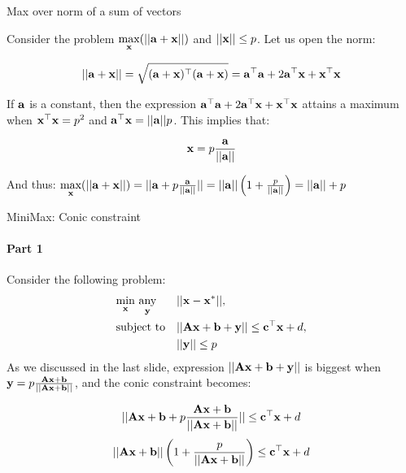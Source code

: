 \documentclass{beamer}
\begin{document}
\begin{frame}{Max over norm of a sum of vectors}
	\begin{flushleft}
		
		Consider the problem $\underset{\mathbf{x}}{\text{max}}(|| \mathbf{a} + \mathbf{x}||)$ and $|| \mathbf{x} || \leq p$. Let us open the norm:
		
		\begin{equation}
			|| \mathbf{a} + \mathbf{x} || = 
			\sqrt{(\mathbf{a} + \mathbf{x})^\top (\mathbf{a} + \mathbf{x})} = 
			\mathbf{a}^\top\mathbf{a} + 2\mathbf{a}^\top\mathbf{x} + \mathbf{x}^\top\mathbf{x}
		\end{equation}
	
	If $\mathbf{a}$ is a constant, then the expression $\mathbf{a}^\top\mathbf{a} + 2\mathbf{a}^\top\mathbf{x} + \mathbf{x}^\top\mathbf{x}$ attains a maximum when $\mathbf{x}^\top\mathbf{x} = p^2$ and $\mathbf{a}^\top\mathbf{x} = ||\mathbf{a}||p$. This implies that:
	
	\begin{equation}
		\mathbf{x} = p\frac{\mathbf{a}}{|| \mathbf{a} ||}
	\end{equation}
	
	And thus: $\underset{\mathbf{x}}{\text{max}}(|| \mathbf{a} + \mathbf{x}||) = 
	|| \mathbf{a} + p\frac{\mathbf{a}}{|| \mathbf{a} ||}|| = 
	|| \mathbf{a} || \left( 1 + \frac{p}{|| \mathbf{a} ||} \right) = 
	|| \mathbf{a} || + p $	
		
	\end{flushleft}
\end{frame}


\begin{frame}{MiniMax: Conic constraint}
	\framesubtitle{Part 1}
	\begin{flushleft}
		
		Consider the following problem:
		\begin{equation}
			\begin{aligned}
				& \underset{\bo{x}}{\text{min}} \ \underset{\bo{y}}{\text{any}}
				& & ||\bo{x} - \bo{x}^*||, \\
				& \text{subject to}
				& & || \bo{A}\bo{x} + \bo{b} + \bo{y} || \leq \bo{c}^\top \bo{x} + d, \\
				& & & ||\bo{y}|| \leq p
			\end{aligned}
		\end{equation}
		As we discussed in the last slide, expression $|| \mathbf{A}\mathbf{x} + \mathbf{b} + \mathbf{y} ||$ is biggest when $\mathbf{y} = p \frac{\mathbf{A}\mathbf{x} + \mathbf{b}}{|| \mathbf{A}\mathbf{x} + \mathbf{b} ||}$, and the conic constraint becomes:
		
		\begin{equation}
			|| \mathbf{A}\mathbf{x} + \mathbf{b} + p \frac{\mathbf{A}\mathbf{x} + \mathbf{b}}{|| \mathbf{A}\mathbf{x} + \mathbf{b} ||} || \leq \mathbf{c}^\top \mathbf{x} + d
		\end{equation}
		\begin{equation}
		|| \mathbf{A}\mathbf{x} + \mathbf{b}|| \left( 1 + \frac{p}{|| \mathbf{A}\mathbf{x} + \mathbf{b}||} \right) \leq \mathbf{c}^\top \mathbf{x} + d
		\end{equation}
		
		
	\end{flushleft}
\end{frame}
\end{document}
